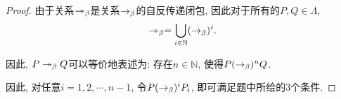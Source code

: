 \begin{proof}
    由于关系$\twoheadrightarrow_{\beta}$是关系$\rightarrow_{\beta}$的自反传递闭包, 因此对于所有的$P,Q\in\Lambda$, 
	$$\twoheadrightarrow_{\beta}=\bigcup_{i\in\mathbb{N}} (\rightarrow_{\beta})^i.$$
	
	因此, $P\twoheadrightarrow_{\beta} Q$可以等价地表述为: 存在$n\in\mathbb{N}$, 使得$P(\rightarrow_{\beta})^n Q$.
	
	因此, 对任意$i=1,2,\cdots, n-1$, 令$P(\rightarrow_{\beta})^iP_i$, 即可满足题中所给的3个条件.
\end{proof}